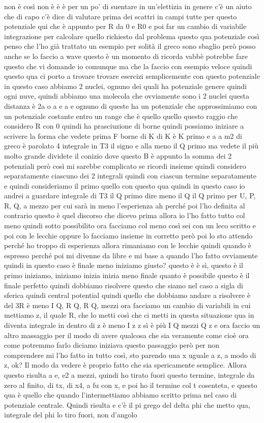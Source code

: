 {\begin{soluzione}
   non è così non è è è per un po' di suentare in un'elettizia in genere c'è un aiuto che di capo c'è dice di valutare prima dei scattri in campi tutte per questo potenziale qui che è appunto per R da 0 e R0 e poi far un cambio di variabile integrazione per calcolare quello richiesto dal problema questo qua potenziale così penso che l'ho già trattato un esempio per solità il greco sono sbaglio però posso anche se lo faccio a wave questo è un momento di ricorda vabbè potrebbe fare questo che vi domande io comunque ma che la faccio con esempio veloce quindi questo qua ci porto a trovare trovare esercizi semplicemente con questo potenziale in questo caso abbiamo 2 nuclei, ognuno dei quali ha potenziale genere quindi ogni nuve, quindi abbiamo una molecola che ovviamente sono i 2 nuclei questa distanza è 2a o a e a e ognuno di queste ha un potenziale che approssimiamo con un potenziale costante entro un range che è quello quello questo raggio che considero R con 0 quindi ha prasciuzione di borne quindi possiamo iniziare a scrivere la forma che vedete prima F borne di K di K è K primo e a a m2 di greco è parolato 4 integrale in T3 il signo e alla meno il Q primo ma vedete il più molto grande dividete il conizio dove questo B è appunto la somma dei 2 potenziali però così mi sarebbe complicato se ricordi insieme quindi considero separatamente ciascuno dei 2 integrali quindi con ciascun termine separatamente e quindi consideriamo il primo quello con questo qua quindi in questo caso io andrei a guardare integrale di T3 il Q primo dire meno il Q il Q primo per U, P, R, Q, a mezzo per cui sarà in meno l'esperienza ah perché poi l'ho definita al contrario questo è quel discorso che dicevo prima allora io l'ho fatto tutto col meno quindi sotto possibilito ora facciamo col meno così sei con un leco scritto e poi con le lecchie oppure lo facciamo insieme in corretto però poi lo sto attendo perché ho troppo di esperienza allora rimaniamo con le lecchie quindi quando è espresso perché poi mi divenne da libre e mi base a quando l'ho fatto ovviamente quindi in questo caso è finale meno iniziamo giusto? questo è è sì, questo è il primo iniziamo, iniziamo inizia inizia meno finale quanto è possibile questo è il finale perfetto quindi dobbiamo risolvere questo che siamo nel caso a sigla di sferica quindi central potential quindi quello che dobbiamo andare a risolvere è del 3R è meno I Q, R Q, R Q, mezzi ora facciamo un cambio di variabili in cui mettiamo z, il quale R, che lo metti così che ci metti in questa situazione qua in diventa integrale in dentro di z è meno I z z sì è più I Q mezzi Q z e ora faccio un altro massaggio per il modo di avere qualcosa che sia veramente come cioè ora come potremmo farlo diciamo iniziava questo passaggio però per non comprendere mi l'ho fatto in tutto così, sto parendo una x uguale a z, a modo di z, ok? Il modo da vedere è proprio fatto che sia spericamente semplice. Allora questo risulta a e, e2 a mezzi, quindi ho tirato fuori questo termine, integrale da zero al finito, di tx, di x4, a fu con x, e poi ho il termine col t cosenteta, e questo qua è quello che quando l'intermettiamo abbiamo scritto prima nel caso di potenziale centrale. Quindi risulta e c'è il pi grego del delta phi che metto qua, integrale del phi lo tiro fuori, non d'angolo 
\end{soluzione}}
